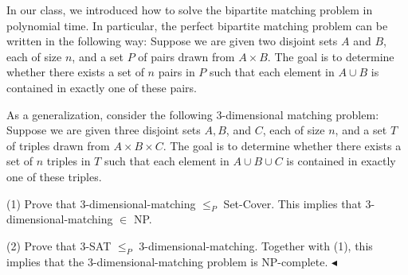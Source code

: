 \documentclass[11pt]{article}
\newenvironment{problem}[2][Problem]{\begin{trivlist}
    \item[\hskip \labelsep{\bfseries#1}\hskip\labelsep{\bfseries#2.}]\mbox{}\newline}{\hfill$\blacktriangleleft$\end{trivlist}}
\begin{document}
\begin{problem}{2. (3-Dimensional Matching)}
In our class, we introduced how to solve the bipartite matching problem in polynomial time. In particular, the perfect bipartite matching problem can be written in the following way: Suppose we are given two disjoint sets $A$ and $B$, each of size $n$, and a set $P$ of pairs drawn from $A \times B$. The goal is to determine whether there exists a set of $n$ pairs in $P$ such that each element in $A \cup B$ is contained in exactly one of these pairs.

As a generalization, consider the following 3-dimensional matching problem: Suppose we are given three disjoint sets $A, B$, and $C$, each of size $n$, and a set $T$ of triples drawn from $A \times B \times C$. The goal is to determine whether there exists a set of $n$ triples in $T$ such that each element in $A \cup B \cup C$ is contained in exactly one of these triples.

(1) Prove that 3-dimensional-matching $\leq_{P}$ Set-Cover. This implies that 3-dimensional-matching $\in$ NP.

(2) Prove that 3-SAT $\leq_{P}$ 3-dimensional-matching. Together with (1), this implies that the 3-dimensional-matching problem is NP-complete.
\end{problem}
\end{document}
